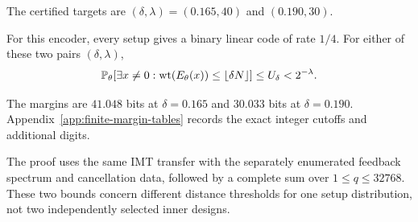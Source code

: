 The certified targets are
$(\delta,\lambda)=(0.165,40)$ and $(0.190,30)$.

\begin{theorem}
\label{thm:finite-quarter-spin}
For this encoder, every setup gives a binary linear code of rate $1/4$.
For either of these two pairs $(\delta,\lambda)$,
\[
 \mathbb P_\theta[\exists x\ne0:\operatorname{wt}(E_\theta(x))\le\lfloor\delta N\rfloor]
 \le U_\delta<2^{-\lambda}.
\]
\end{theorem}

The margins are $41.048$ bits at $\delta=0.165$ and $30.033$ bits at
$\delta=0.190$. Appendix~\ref{app:finite-margin-tables} records the exact
integer cutoffs and additional digits.

The proof uses the same IMT transfer with the separately enumerated feedback
spectrum and cancellation data, followed by a complete sum over
$1\le q\le32768$. These two bounds concern different distance thresholds
for one setup distribution, not two independently selected inner designs.
